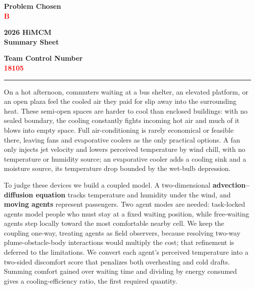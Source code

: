 \documentclass[11pt]{article}
\begin{document}
\thispagestyle{empty}

\begin{center}
\begin{minipage}[c]{0.30\textwidth}
\centering
\textbf{Problem Chosen}\\[2pt]
{\Large \textcolor{red}{\textbf{B}}}
\end{minipage}%
\hfill
\begin{minipage}[c]{0.40\textwidth}
\centering
\textbf{2026 HiMCM}\\[2pt]
\textbf{Summary Sheet}
\end{minipage}%
\hfill
\begin{minipage}[c]{0.30\textwidth}
\centering
\textbf{Team Control Number}\\[2pt]
{\Large \textcolor{red}{\textbf{18105}}}
\end{minipage}
\end{center}

\vspace{6pt}
\noindent\hrule
\vspace{12pt}

\noindent
On a hot afternoon, commuters waiting at a bus shelter, an elevated platform, or
an open plaza feel the cooled air they paid for slip away into the surrounding
heat. These semi-open spaces are harder to cool than enclosed buildings: with no
sealed boundary, the cooling constantly fights incoming hot air and much of it
blows into empty space. Full air-conditioning is rarely economical or feasible
there, leaving fans and evaporative coolers as the only practical options. A fan
only injects jet velocity and lowers perceived temperature by wind chill, with no
temperature or humidity source; an evaporative cooler adds a cooling sink and a
moisture source, its temperature drop bounded by the wet-bulb depression.

To judge these devices we build a coupled model. A two-dimensional
\textbf{advection--diffusion equation} tracks temperature and humidity under the
wind, and \textbf{moving agents} represent passengers. Two agent modes are needed:
task-locked agents model people who must stay at a fixed waiting position, while
free-waiting agents step locally toward the most comfortable nearby cell. We keep
the coupling one-way, treating agents as field observers, because resolving
two-way plume-obstacle-body interactions would multiply the cost; that refinement
is deferred to the limitations. We convert each agent's perceived temperature
into a two-sided discomfort score that penalizes both overheating and cold
drafts. Summing comfort gained over waiting time and dividing by energy consumed
gives a cooling-efficiency ratio, the first required quantity.
\end{document}
